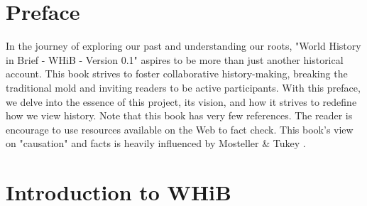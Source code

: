 \documentclass[a4paper,12pt]{book}
\begin{document}
\begin{titlepage}
\end{titlepage}


\tableofcontents
\cleardoublepage

\chapter*{Preface}
In the journey of exploring our past and understanding our roots, "World History in Brief - WHiB - Version 0.1" aspires to be more than just another historical account. This book strives to foster collaborative history-making, breaking the traditional mold and inviting readers to be active participants. With this preface, we delve into the essence of this project, its vision, and how it strives to redefine how we view history. Note that this book has very few references. The reader is encourage to use resources available on the Web to fact check. This book's view on "causation" and facts is heavily influenced by Mosteller & Tukey \cite{mosteller1977}.

\chapter{Introduction to WHiB}
\end{document}
